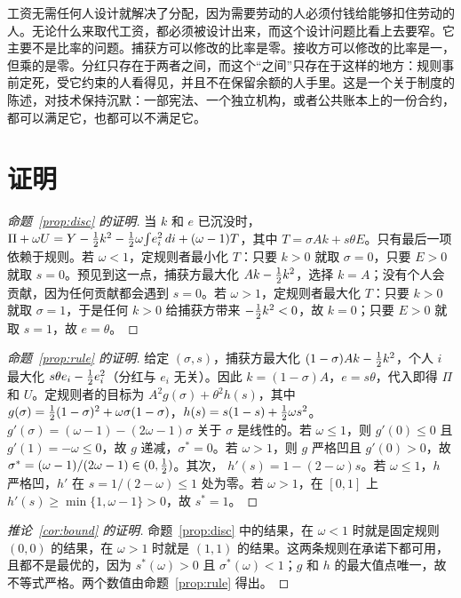 工资无需任何人设计就解决了分配，因为需要劳动的人必须付钱给能够扣住劳动的人。无论什么来取代工资，都必须被设计出来，而这个设计问题比看上去要窄。它主要不是比率的问题。捕获方可以修改的比率是零。接收方可以修改的比率是一，但乘的是零。分红只存在于两者之间，而这个“之间”只存在于这样的地方：规则事前定死，受它约束的人看得见，并且不在保留余额的人手里。这是一个关于制度的陈述，对技术保持沉默：一部宪法、一个独立机构，或者公共账本上的一份合约，都可以满足它，也都可以不满足它。

\appendix
\section{证明}

\begin{proof}[命题~\ref{prop:disc} 的证明]
当 $k$ 和 $e$ 已沉没时，$\Pi+\omega U=Y-\tfrac{1}{2} k^2-\tfrac{1}{2}\omega\!\int\! e_i^2\,di+(\omega-1)T$，其中 $T=\sigma Ak+s\theta E$。只有最后一项依赖于规则。若 $\omega<1$，定规则者最小化 $T$：只要 $k>0$ 就取 $\sigma=0$，只要 $E>0$ 就取 $s=0$。预见到这一点，捕获方最大化
$Ak-\tfrac{1}{2} k^2$，选择 $k=A$；没有个人会贡献，因为任何贡献都会遇到 $s=0$。若 $\omega>1$，定规则者最大化 $T$：只要 $k>0$ 就取 $\sigma=1$，于是任何 $k>0$ 给捕获方带来
$-\tfrac{1}{2} k^2<0$，故 $k=0$；只要 $E>0$ 就取 $s=1$，故 $e=\theta$。
\end{proof}

\begin{proof}[命题~\ref{prop:rule} 的证明]
给定 $(\sigma,s)$，捕获方最大化 $(1-\sigma)Ak-\tfrac{1}{2} k^2$，个人 $i$ 最大化
$s\theta e_i-\tfrac{1}{2} e_i^2$（分红与 $e_i$ 无关）。因此 $k=(1-\sigma)A$，$e=s\theta$，代入即得
$\Pi$ 和 $U$。定规则者的目标为 $A^2g(\sigma)+\theta^2h(s)$，其中
$g(\sigma)=\tfrac{1}{2}(1-\sigma)^2+\omega\sigma(1-\sigma)$，$h(s)=s(1-s)+\tfrac{1}{2}\omega s^2$。
$g'(\sigma)=(\omega-1)-(2\omega-1)\sigma$ 关于 $\sigma$ 是线性的。若 $\omega\le 1$，则
$g'(0)\le 0$ 且 $g'(1)=-\omega\le 0$，故 $g$ 递减，$\sigma^*=0$。若 $\omega>1$，则 $g$
严格凹且 $g'(0)>0$，故 $\sigma^*=(\omega-1)/(2\omega-1)\in(0,\tfrac{1}{2})$。其次，
$h'(s)=1-(2-\omega)s$。若 $\omega\le 1$，$h$ 严格凹，$h'$ 在 $s=1/(2-\omega)\le 1$ 处为零。若 $\omega>1$，在 $[0,1]$ 上 $h'(s)\ge\min\{1,\omega-1\}>0$，故 $s^*=1$。
\end{proof}

\begin{proof}[推论~\ref{cor:bound} 的证明]
命题~\ref{prop:disc} 中的结果，在 $\omega<1$ 时就是固定规则 $(0,0)$ 的结果，在 $\omega>1$
时就是 $(1,1)$ 的结果。这两条规则在承诺下都可用，且都不是最优的，因为 $s^*(\omega)>0$ 且
$\sigma^*(\omega)<1$；$g$ 和 $h$ 的最大值点唯一，故不等式严格。两个数值由命题~\ref{prop:rule} 得出。
\end{proof}

